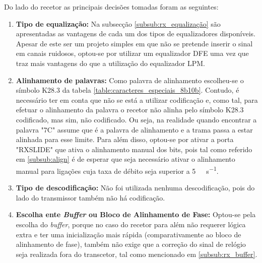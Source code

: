 Do lado do recetor as principais decisões tomadas foram as seguintes:
\begin{enumerate}
	\item \textbf{Tipo de equalização:} Na subsecção \ref{subsub:rx_equalização} são apresentadas as vantagens de cada um dos tipos de equalizadores disponíveis. Apesar de este ser um projeto simples em que não se pretende inserir o sinal em canais ruidosos, optou-se por utilizar um equalizador DFE uma vez que traz mais vantagens do que a utilização do equalizador LPM.
	
	\item \textbf{Alinhamento de palavras:} Como palavra de alinhamento escolheu-se o símbolo K28.3 da tabela \ref{table:caracteres_especiais_8b10b}. Contudo, é necessário ter em conta que não se está a utilizar codificação e, como tal, para efetuar o alinhamento da palavra o recetor não alinha pelo símbolo K28.3 codificado, mas sim, não codificado. Ou seja, na realidade quando encontrar a palavra "7C" assume que é a palavra de alinhamento e a trama passa a estar alinhada para esse limite. Para além disso, optou-se por ativar a porta "RXSLIDE" que ativa o alinhamento manual dos bits, pois tal como referido em \ref{subsub:align} é de esperar que seja necessário ativar o alinhamento manual para ligações cuja taxa de débito seja superior a \SI{5}{\giga\bit\per\second}.
	
	\item \textbf{Tipo de descodificação:} Não foi utilizada nenhuma descodificação, pois do lado do transmissor também não há codificação.
	\item \textbf{Escolha ente \textit{Buffer} ou Bloco de Alinhamento de Fase:} Optou-se pela escolha do \textit{buffer}, porque no caso do recetor para além não requerer lógica extra e ter uma inicialização mais rápida (comparativamente ao bloco de alinhamento de fase), também não exige que a correção do sinal de relógio seja realizada fora do transcetor, tal como mencionado em \ref{subsub:rx_buffer}.
\end{enumerate}

